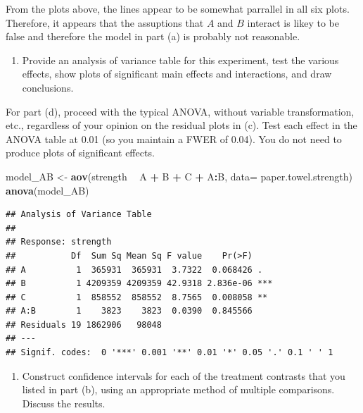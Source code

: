 \documentclass[12pt,]{article}
\newenvironment{Shaded}{\begin{snugshade}}{\end{snugshade}}
\newcommand{\KeywordTok}[1]{\textcolor[rgb]{0.13,0.29,0.53}{\textbf{#1}}}
\newcommand{\DataTypeTok}[1]{\textcolor[rgb]{0.13,0.29,0.53}{#1}}
\newcommand{\StringTok}[1]{\textcolor[rgb]{0.31,0.60,0.02}{#1}}
\newcommand{\OperatorTok}[1]{\textcolor[rgb]{0.81,0.36,0.00}{\textbf{#1}}}
\newcommand{\NormalTok}[1]{#1}
\providecommand{\tightlist}{%
  \setlength{\itemsep}{0pt}\setlength{\parskip}{0pt}}
\begin{document}
From the plots above, the lines appear to be somewhat parrallel in all
six plots. Therefore, it appears that the assuptions that \(A\) and
\(B\) interact is likey to be false and therefore the model in part (a)
is probably not reasonable.

\begin{enumerate}
\def\labelenumi{(\alph{enumi})}
\setcounter{enumi}{3}
\tightlist
\item
  Provide an analysis of variance table for this experiment, test the
  various effects, show plots of significant main effects and
  interactions, and draw conclusions.
\end{enumerate}

For part (d), proceed with the typical ANOVA, without variable
transformation, etc., regardless of your opinion on the residual plots
in (c). Test each effect in the ANOVA table at 0.01 (so you maintain a
FWER of 0.04). You do not need to produce plots of significant effects.

\begin{Shaded}
\begin{Highlighting}[]
\NormalTok{model_AB <-}\StringTok{ }\KeywordTok{aov}\NormalTok{(strength }\OperatorTok{~}\StringTok{ }\NormalTok{A }\OperatorTok{+}\StringTok{ }\NormalTok{B }\OperatorTok{+}\StringTok{ }\NormalTok{C }\OperatorTok{+}\StringTok{ }\NormalTok{A}\OperatorTok{:}\NormalTok{B, }\DataTypeTok{data=}\NormalTok{ paper.towel.strength)}
\KeywordTok{anova}\NormalTok{(model_AB)}
\end{Highlighting}
\end{Shaded}

\begin{verbatim}
## Analysis of Variance Table
## 
## Response: strength
##           Df  Sum Sq Mean Sq F value    Pr(>F)    
## A          1  365931  365931  3.7322  0.068426 .  
## B          1 4209359 4209359 42.9318 2.836e-06 ***
## C          1  858552  858552  8.7565  0.008058 ** 
## A:B        1    3823    3823  0.0390  0.845566    
## Residuals 19 1862906   98048                      
## ---
## Signif. codes:  0 '***' 0.001 '**' 0.01 '*' 0.05 '.' 0.1 ' ' 1
\end{verbatim}

\begin{enumerate}
\def\labelenumi{(\alph{enumi})}
\setcounter{enumi}{4}
\tightlist
\item
  Construct confidence intervals for each of the treatment contrasts
  that you listed in part (b), using an appropriate method of multiple
  comparisons. Discuss the results.
\end{enumerate}
\end{document}
